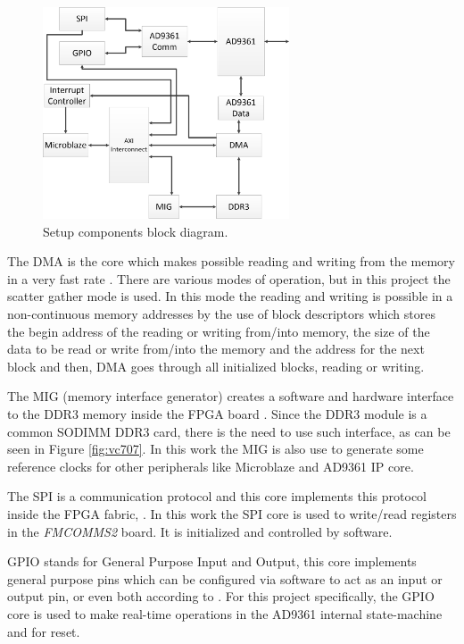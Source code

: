 \begin{figure}[htbp]
    \centering
    \includegraphics[width=0.65\textwidth]{./figures/setup_ip}
    \caption{ Setup components block diagram.
    \label{fig:setupip}}
\end{figure}


The DMA is the core which makes possible reading and writing from the memory in
a very fast rate \cite{xilinx:axidma}. There are various modes of operation, but
in this project the scatter gather mode is used. In this mode the reading and
writing is possible in a non-continuous memory addresses by the use of block
descriptors which stores the begin address of the reading or writing  from/into
memory, the size of the data to be read or write from/into the memory and the
address for the next block and then, DMA goes through all initialized blocks,
reading or writing.

The MIG (memory interface generator) creates a software and hardware interface
to the DDR3 memory inside the FPGA board \cite{xilinx:mig7}. Since the DDR3
module is a common SODIMM DDR3 card, there is the need to use such interface, as
can be seen in Figure \ref{fig:vc707}. In this work the MIG is also use to
generate some reference clocks for other peripherals like Microblaze and AD9361
IP core.

The SPI is a communication protocol and this core implements this protocol
inside the FPGA fabric, \cite{xilinx:axiquadspi}. In this work the SPI core
is used to write/read registers in the \emph{FMCOMMS2} board. It is
initialized and controlled by software.

GPIO stands for General Purpose Input and Output, this core implements general
purpose pins which can be configured via software to act as an input or output
pin, or even both according to \cite{xilinx:axigpio}. For this project
specifically, the GPIO core is used to make real-time operations in the AD9361
internal state-machine and for reset.

